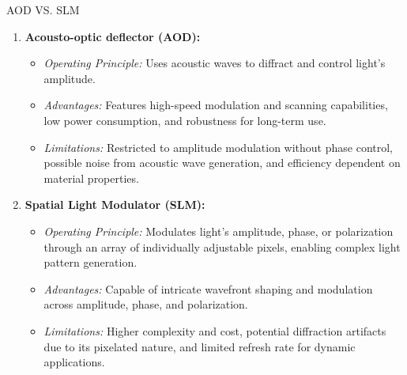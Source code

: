 \documentclass[18 pt]{beamer}
\begin{document}
\begin{frame}{AOD VS. SLM}
  \begin{enumerate}[itemsep=10pt]
    \item \textbf{Acousto-optic deflector (AOD):}
    \begin{itemize}[itemsep=5pt]
      \small
      \item \textit{Operating Principle:} Uses acoustic waves to diffract and control light's amplitude.
      \item \textit{Advantages:} Features high-speed modulation and scanning capabilities, low power consumption, and robustness for long-term use.
      \item \textit{Limitations:} Restricted to amplitude modulation without phase control, possible noise from acoustic wave generation, and efficiency dependent on material properties.
    \end{itemize}
    \item \textbf{Spatial Light Modulator (SLM):}
    \begin{itemize}[itemsep=5pt]
        \item \small \textit{Operating Principle:} Modulates light's amplitude, phase, or polarization through an array of individually adjustable pixels, enabling complex light pattern generation.
        \item \textit{Advantages:} Capable of intricate wavefront shaping and modulation across amplitude, phase, and polarization.
        \item \textit{Limitations:} Higher complexity and cost, potential diffraction artifacts due to its pixelated nature, and limited refresh rate for dynamic applications.
    \end{itemize}
  \end{enumerate}
\end{frame}
\end{document}
